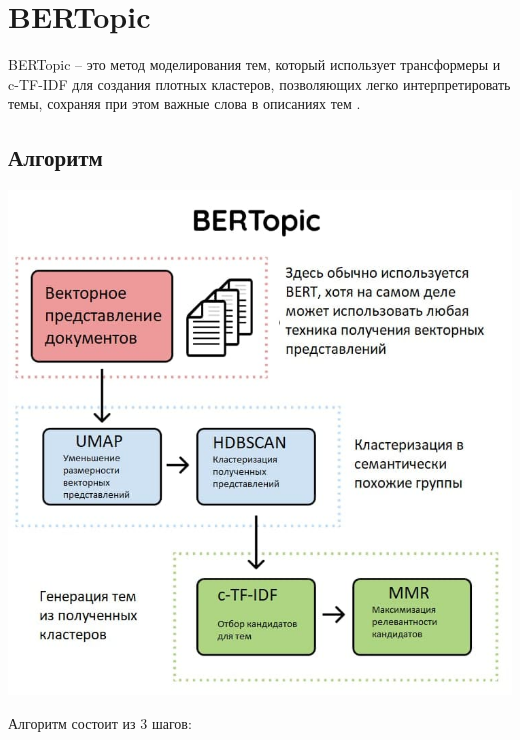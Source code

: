 \section{BERTopic}

BERTopic -- это метод моделирования тем, который использует трансформеры и c-TF-IDF для создания плотных кластеров, позволяющих легко интерпретировать темы, сохраняя при этом важные слова в описаниях тем \cite{bib234234}. 

\subsection{Алгоритм}

\begin{center}
\includegraphics[scale=0.7]{pics/bertopic.jpg}
\end{center}

Алгоритм состоит из 3 шагов:

